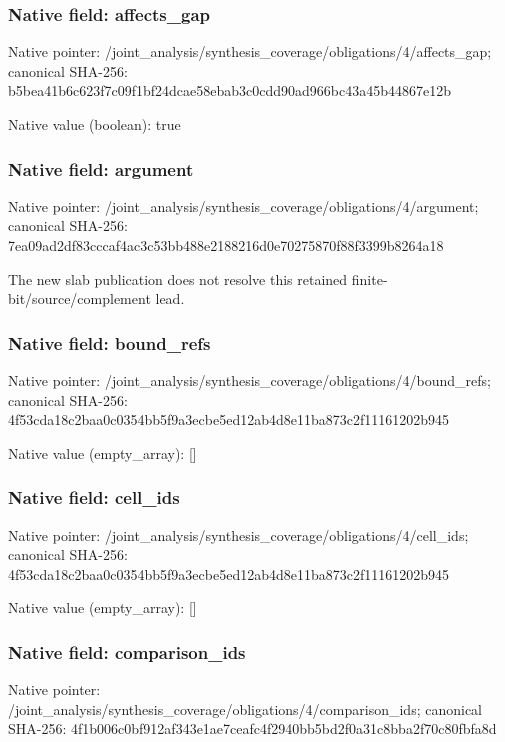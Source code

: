 \documentclass[10pt,a4paper]{article}
\begin{document}
\subsubsection{Native field: affects\_\allowbreak{}gap}
Native pointer: /joint\_\allowbreak{}analysis/synthesis\_\allowbreak{}coverage/obligations/4/affects\_\allowbreak{}gap; canonical SHA-256: b5bea41b6c623f7c09f1bf24dcae58ebab3c0cdd90ad966bc43a45b44867e12b

Native value (boolean): true

\subsubsection{Native field: argument}
Native pointer: /joint\_\allowbreak{}analysis/synthesis\_\allowbreak{}coverage/obligations/4/argument; canonical SHA-256: 7ea09ad2df83cccaf4ac3c53bb488e2188216d0e70275870f88f3399b8264a18

\begingroup\raggedright\sloppy The new slab publication does not resolve this retained finite-bit/\allowbreak{}source/\allowbreak{}complement lead.\par\endgroup

\subsubsection{Native field: bound\_\allowbreak{}refs}
Native pointer: /joint\_\allowbreak{}analysis/synthesis\_\allowbreak{}coverage/obligations/4/bound\_\allowbreak{}refs; canonical SHA-256: 4f53cda18c2baa0c0354bb5f9a3ecbe5ed12ab4d8e11ba873c2f11161202b945

Native value (empty\_\allowbreak{}array): []

\subsubsection{Native field: cell\_\allowbreak{}ids}
Native pointer: /joint\_\allowbreak{}analysis/synthesis\_\allowbreak{}coverage/obligations/4/cell\_\allowbreak{}ids; canonical SHA-256: 4f53cda18c2baa0c0354bb5f9a3ecbe5ed12ab4d8e11ba873c2f11161202b945

Native value (empty\_\allowbreak{}array): []

\subsubsection{Native field: comparison\_\allowbreak{}ids}
Native pointer: /joint\_\allowbreak{}analysis/synthesis\_\allowbreak{}coverage/obligations/4/comparison\_\allowbreak{}ids; canonical SHA-256: 4f1b006c0bf912af343e1ae7ceafc4f2940bb5bd2f0a31c8bba2f70c80fbfa8d
\end{document}
